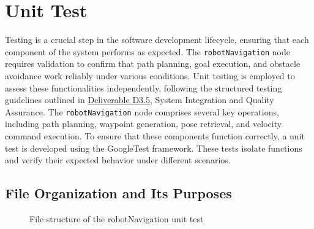 \documentclass{CSSRforAfrica}
\renewcommand{\DTstyle}{\footnotesize\sffamily}
\begin{document}
\newpage
\section{Unit Test}
Testing is a crucial step in the software development lifecycle, ensuring that each component of the system performs as expected. The \verb|robotNavigation| node requires validation to confirm that path planning, goal execution, and obstacle avoidance work reliably under various conditions. Unit testing is employed to assess these functionalities independently, following the structured testing guidelines outlined in \href{https://cssr4africa.github.io/deliverables/CSSR4Africa_Deliverable_D3.5.pdf}{Deliverable D3.5}, System Integration and Quality Assurance.
The \verb|robotNavigation| node comprises several key operations, including path planning, waypoint generation, pose retrieval, and velocity command execution. To ensure that these components function correctly, a unit test is developed using the GoogleTest framework. These tests isolate functions and verify their expected behavior under different scenarios.

\subsection{File Organization and Its Purposes}
\vspace*{0.5em}
\begin{figure}[H]
	\renewcommand*\DTstyle{\ttfamily}
	\caption{File structure of the robotNavigation unit test}
	\label{fig:navigation_test_structure}
\end{figure}
\end{document}
